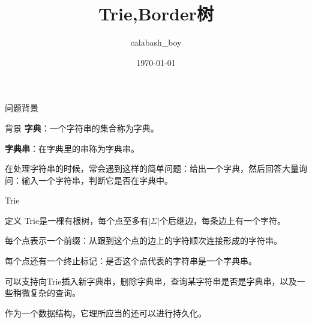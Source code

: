 \documentclass{ctexbeamer}		%
\date{}	%
\title[String]{Trie,Border树}	%
\author[calabash\_boy]{calabash\_boy} %
\date{\today}
\begin{document}


\begin{frame}	

\titlepage	%
	
\end{frame}		

\begin{frame}{问题背景}

\begin{block}{背景}
\textbf{字典}：一个字符串的集合称为字典。

\textbf{字典串}：在字典里的串称为字典串。
\hphantom{ }

在处理字符串的时候，常会遇到这样的简单问题：给出一个字典，然后回答大量询问：输入一个字符串，判断它是否在字典中。

\end{block}
    
\end{frame}

\begin{frame}{Trie}

\begin{block}{定义}
Trie是一棵有根树，每个点至多有$|\Sigma|$个后继边，每条边上有一个字符。

每个点表示一个前缀：从跟到这个点的边上的字符顺次连接形成的字符串。

每个点还有一个终止标记：是否这个点代表的字符串是一个字典串。

\hphantom{}

\pause

可以支持向Trie插入新字典串，删除字典串，查询某字符串是否是字典串，以及一些稍微复杂的查询。

作为一个数据结构，它理所应当的还可以进行持久化。

\end{block}    
\end{frame}
\end{document}
